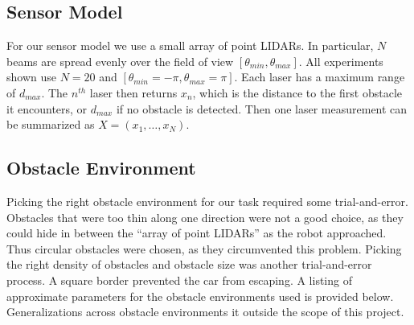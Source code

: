 \documentclass{article}
\begin{document}
\subsection{Sensor Model}
For our sensor model we use a small array of point LIDARs. In particular, $N$ beams are spread evenly over the field of view $[\theta_{min},\theta_{max}]$.  All experiments shown use $N=20$ and $[\theta_{min}=-\pi,\theta_{max}=\pi]$.   Each laser has a maximum range of $d_{max}$. The $n^{th}$ laser then returns $x_n$, which is the distance to the first obstacle it encounters, or $d_{max}$ if no obstacle is detected. Then one laser measurement can be summarized as $X = (x_1,\ldots,x_N)$.

\subsection{Obstacle Environment}
Picking the right obstacle environment for our task required some trial-and-error.  Obstacles that were too thin along one direction were not a good choice, as they could hide in between the ``array of point LIDARs'' as the robot approached.  Thus circular obstacles were chosen, as they circumvented this problem.  Picking the right density of obstacles and obstacle size was another trial-and-error process.  A square border prevented the car from escaping.  A listing of approximate parameters for the obstacle environments used is provided below.  Generalizations across obstacle environments it outside the scope of this project.

\end{document}
